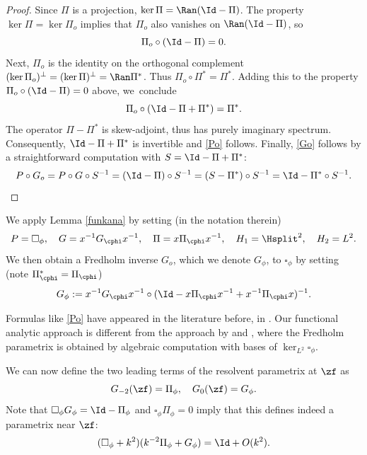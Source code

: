 \begin{proof}
Since $\Pi$ is a projection, $\ker \Pi = \Ran(\Id - \Pi)$.
The property $\ker \Pi = \ker \Pi_o$ implies that $\Pi_o$ also vanishes on
$\Ran(\Id - \Pi)$, so
\[
\Pi_o \circ (\Id - \Pi) = 0.
\]
Next, $\Pi_o$ is the identity on the orthogonal complement $(\ker \Pi_o)^\perp = (\ker \Pi)^\perp =
\Ran\Pi^*$. Thus $\Pi_o \circ \Pi^* = \Pi^*$. Adding this to the property
$\Pi_o \circ (\Id - \Pi) = 0$ above, we~conclude
\[
\Pi_o \circ (\Id - \Pi + \Pi^*) = \Pi^*.
\]
The operator $\Pi - \Pi^*$ is skew-adjoint, thus has purely imaginary spectrum.
Consequently, $\Id - \Pi + \Pi^*$ is invertible and \eqref{Po} follows.
Finally, \eqref{Go} follows by a straightforward computation with $S= \Id - \Pi + \Pi^*$:
\[
P\circ G_o=P \circ G \circ S^{-1} =
\left(\Id - \Pi\right) \circ S^{-1}
= \left(S - \Pi^*\right) \circ S^{-1} = \Id - \Pi^* \circ S^{-1}.\qedhere
\]
\end{proof}

We apply Lemma \ref{funkana} by setting (in the notation therein)
\[
P=\square_\phi, \quad G=x^{-1}G_{\cphi}x^{-1}, \quad \Pi=x\Pi_{\cphi}x^{-1},\quad
H_1=\Hsplit^2,\quad H_2=L^2.
\]
We then obtain a Fredholm inverse $G_o$, which we denote $G_\phi$, to $\square_\phi$ by setting (note $\Pi_{\cphi}^*=\Pi_{\cphi}$)
\begin{equation}\label{Gphi}
G_\phi:= x^{-1} G_{\cphi} x^{-1} \circ (\Id - x \Pi_{\cphi} x^{-1} + x^{-1} \Pi_{\cphi} x)^{-1}.
\end{equation}

\begin{Rem}
Formulas like \eqref{Po} have appeared in the literature before, \eg in \cite[Lem.\,3.5]{BLZ09}.
Our functional analytic approach is different from the
approach by \cite{guillarmou2014low} and \cite{guillarmou2008resolvent}, where
the Fredholm parametrix is obtained by algebraic computation with bases of
$\ker_{L^2} \square_{\phi}$.
\end{Rem}

We can now define the two leading terms of the
resolvent parametrix at $\zf$ as
\begin{equation}\label{Gkphi}
G_{-2}(\zf) = \Pi_\phi,\quad G_0(\zf) = G_\phi.
\end{equation}
Note that $\square_{\phi} G_{\phi} = \Id - \Pi_{\phi}$ and $\square_\phi \Pi_\phi=0$ imply that this defines indeed a parametrix near $\zf$:
\begin{equation}
\label{eqn:zf param eqn}
(\square_\phi+k^2)(k^{-2} \Pi_\phi + G_\phi) = \Id + O(k^2).
\end{equation}

